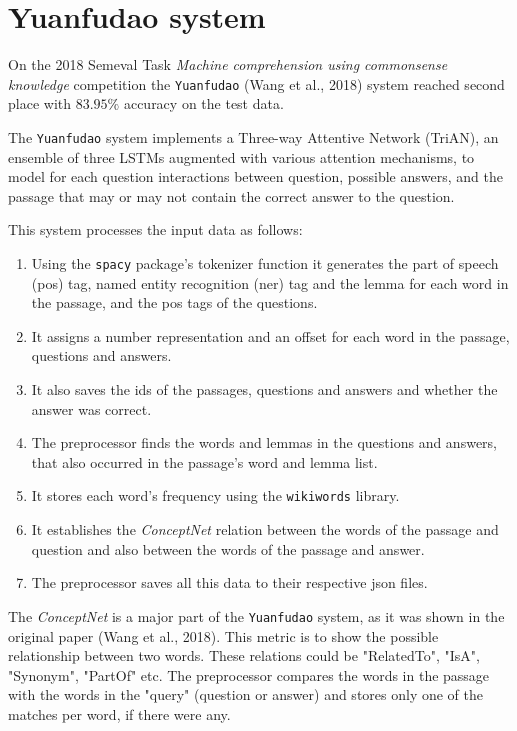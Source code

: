 \chapter*{Yuanfudao system}
On the 2018 Semeval Task \textit{Machine comprehension using commonsense knowledge} competition the \texttt{Yuanfudao} (Wang et al., 2018) system reached second place with $83.95\%$ accuracy on the test data.


The \texttt{Yuanfudao} system implements a Three-way Attentive Network (TriAN), an ensemble of three LSTMs augmented with various attention mechanisms, to model for each question interactions between question, possible answers, and the passage that may or may not contain the correct answer to the question.


This system processes the input data as follows:

\begin{enumerate}
	\item Using the \texttt{spacy} package's tokenizer function it generates the part of speech (pos) tag, named entity recognition (ner) tag and the lemma for each word in the passage, and the pos tags of the questions.
	\item It assigns a number representation and an offset for each word in the passage, questions and answers.
	\item It also saves the ids of the passages, questions and answers and whether the answer was correct.
	\item The preprocessor finds the words and lemmas in the questions and answers, that also occurred in the passage's word and lemma list. 
	\item It stores each word's frequency using the \texttt{wikiwords} library.
	\item It  establishes the \textit{ConceptNet} relation between the words of the passage and question and also between the words of the passage and answer.
	\item The preprocessor saves all this data to their respective json files.
\end{enumerate}


The \textit{ConceptNet} is a major part of the \texttt{Yuanfudao} system, as it was shown in the original paper (Wang et al., 2018). This metric is to show the possible relationship between two words. These relations could be "RelatedTo", "IsA", "Synonym", "PartOf" etc. The preprocessor compares the words in the passage with the words in the "query" (question or answer) and stores only one of the matches per word, if there were any.

